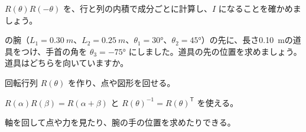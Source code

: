 \bkproblem $R(\theta)R(-\theta)$ を、行と列の内積で成分ごとに計算し、$I$ になることを確かめましょう。

\bkproblem {}の腕（$L_1=\qty{0.30}{m}$、$L_2=\qty{0.25}{m}$、$\theta_1=30°$、$\theta_2=45°$）の先に、長さ\qty{0.10}{m}の道具をつけ、手首の角を $\theta_3=-75°$ にしました。道具の先の位置を求めましょう。道具はどちらを向いていますか。


\begin{furikaeri}
\begin{checklist}
\item 回転行列 $R(\theta)$ を作り、点や図形を回せる。
\item $R(\alpha)R(\beta)=R(\alpha+\beta)$ と $R(\theta)^{-1}=R(\theta)^{\mathsf T}$ を使える。
\item 軸を回して点や力を見たり、腕の手の位置を求めたりできる。
\end{checklist}
\end{furikaeri}

